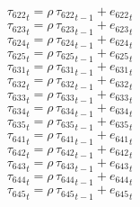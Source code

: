 \begin{dmath}
{{\tau_{622}}}_{t}={{\rho}}\, {{\tau_{622}}}_{t-1}+{{e_{622}}}_{t}
\end{dmath}
\begin{dmath}
{{\tau_{623}}}_{t}={{\rho}}\, {{\tau_{623}}}_{t-1}+{{e_{623}}}_{t}
\end{dmath}
\begin{dmath}
{{\tau_{624}}}_{t}={{\rho}}\, {{\tau_{624}}}_{t-1}+{{e_{624}}}_{t}
\end{dmath}
\begin{dmath}
{{\tau_{625}}}_{t}={{\rho}}\, {{\tau_{625}}}_{t-1}+{{e_{625}}}_{t}
\end{dmath}
\begin{dmath}
{{\tau_{631}}}_{t}={{\rho}}\, {{\tau_{631}}}_{t-1}+{{e_{631}}}_{t}
\end{dmath}
\begin{dmath}
{{\tau_{632}}}_{t}={{\rho}}\, {{\tau_{632}}}_{t-1}+{{e_{632}}}_{t}
\end{dmath}
\begin{dmath}
{{\tau_{633}}}_{t}={{\rho}}\, {{\tau_{633}}}_{t-1}+{{e_{633}}}_{t}
\end{dmath}
\begin{dmath}
{{\tau_{634}}}_{t}={{\rho}}\, {{\tau_{634}}}_{t-1}+{{e_{634}}}_{t}
\end{dmath}
\begin{dmath}
{{\tau_{635}}}_{t}={{\rho}}\, {{\tau_{635}}}_{t-1}+{{e_{635}}}_{t}
\end{dmath}
\begin{dmath}
{{\tau_{641}}}_{t}={{\rho}}\, {{\tau_{641}}}_{t-1}+{{e_{641}}}_{t}
\end{dmath}
\begin{dmath}
{{\tau_{642}}}_{t}={{\rho}}\, {{\tau_{642}}}_{t-1}+{{e_{642}}}_{t}
\end{dmath}
\begin{dmath}
{{\tau_{643}}}_{t}={{\rho}}\, {{\tau_{643}}}_{t-1}+{{e_{643}}}_{t}
\end{dmath}
\begin{dmath}
{{\tau_{644}}}_{t}={{\rho}}\, {{\tau_{644}}}_{t-1}+{{e_{644}}}_{t}
\end{dmath}
\begin{dmath}
{{\tau_{645}}}_{t}={{\rho}}\, {{\tau_{645}}}_{t-1}+{{e_{645}}}_{t}
\end{dmath}
